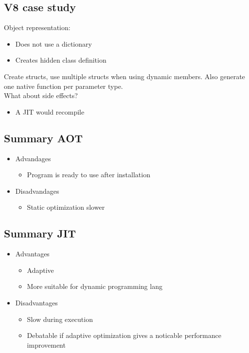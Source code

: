 \documentclass[a4paper]{article}
\begin{document}
\subsection{V8 case study}
Object representation:
\begin{itemize}
    \item Does not use a dictionary
    \item Creates hidden class definition
\end{itemize}
Create structs, use multiple structs when using dynamic members. Also generate
one native function per parameter type.\\
What about side effects?
\begin{itemize}
    \item A JIT would recompile
\end{itemize}
\subsection{Summary AOT}
\begin{itemize}
    \item Advandages
        \begin{itemize}
            \item Program is ready to use after installation
        \end{itemize}
    \item Disadvandages
        \begin{itemize}
            \item Static optimization slower
        \end{itemize}
\end{itemize}
\subsection{Summary JIT}
\begin{itemize}
    \item Advantages
        \begin{itemize}
            \item Adaptive
            \item More suitable for dynamic programming lang
        \end{itemize}
    \item Disadvantages
        \begin{itemize}
            \item Slow during execution
            \item Debatable if adaptive optimization gives a noticable performance
                improvement
        \end{itemize}
\end{itemize}
\end{document}
